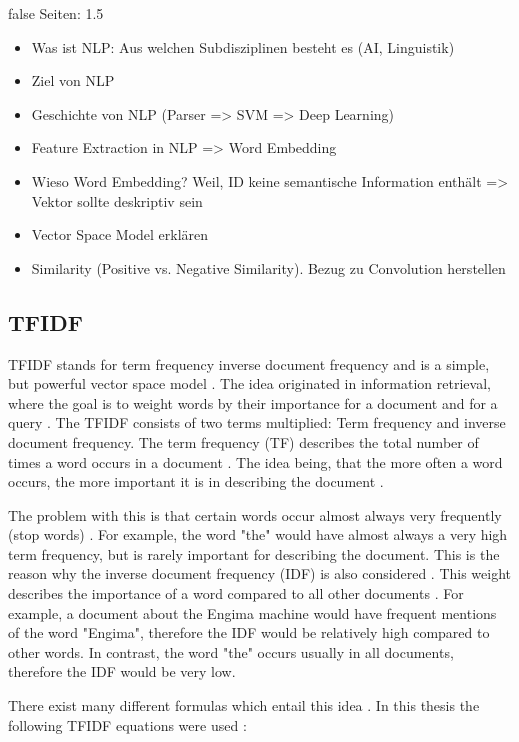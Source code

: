 \documentclass[draft,final,oneside]{vutinfth} %
\begin{document}
\if false
Seiten: 1.5
\begin{itemize}
\item Was ist NLP: Aus welchen Subdisziplinen besteht es (AI, Linguistik)
\item Ziel von NLP
\item Geschichte von NLP (Parser => SVM => Deep Learning)
\item Feature Extraction in NLP => Word Embedding
\item Wieso Word Embedding? Weil, ID keine semantische Information enthält => Vektor sollte deskriptiv sein
\item Vector Space Model erklären
\item Similarity (Positive vs. Negative Similarity). Bezug zu Convolution herstellen
\end{itemize}

\fi

\subsection{TFIDF}


TFIDF stands for term frequency inverse document frequency and is a simple, but powerful vector space model \cite{tfidf}. The idea originated in information retrieval, where the goal is to weight words by their importance for a document and for a query \cite{historyinformationretrieval}. The TFIDF consists of two terms multiplied: Term frequency and inverse document frequency. The term frequency (TF) describes the total number of times a word occurs in a document  \cite{irsurvey}. The idea being, that the more often a word occurs, the more important it is in describing the document  \cite{irsurvey}.

The problem with this is that certain words occur almost always very frequently (stop words) \cite{tfidf}. For example, the word "the" would have almost always a very high term frequency, but is rarely important for describing the document. This is the reason why the inverse document frequency (IDF) is also considered \cite{tfidf}. This weight describes the importance of a word compared to all other documents \cite{historyinformationretrieval}. For example, a document about the Engima machine would have frequent mentions of the word "Engima", therefore the IDF would be relatively high compared to other words. In contrast, the word "the" occurs usually in all documents, therefore the IDF would be very low.

There exist many different formulas which entail this idea \cite{tfidf}. In this thesis the following TFIDF equations were used \cite{tfidf}:
\end{document}

